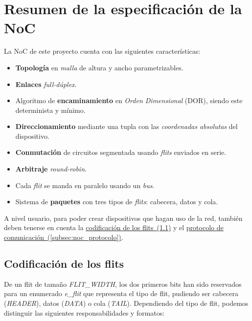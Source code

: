 \section{Resumen de la especificación de la NoC}
\label{sec:especificacion}

La NoC de este proyecto cuenta con las siguientes características:

\begin{itemize}[noitemsep]
    \item \textbf{Topología} en \textit{malla} de altura y ancho parametrizables.
    \item \textbf{Enlaces} \textit{full-dúplex}.
    \item Algoritmo de \textbf{encaminamiento} en \textit{Orden Dimensional} (DOR), siendo este determinista y mínimo.
    \item \textbf{Direccionamiento} mediante una tupla con las \textit{coordenadas absolutas} del dispositivo.
    \item \textbf{Conmutación} de circuitos segmentada usando \textit{flits} enviados en serie.
    \item \textbf{Arbitraje} \textit{round-robin}.
    \item Cada \textit{flit} se manda en paralelo usando un \textit{bus}.
    \item Sistema de \textbf{paquetes} con tres tipos de \textit{flits}: cabecera, datos y cola.
\end{itemize}

A nivel usuario, para poder crear dispositivos que hagan uso de la red, también deben tenerse en cuenta la \hyperref[subsec:codificacion_flits]{codificación de los flits~(\ref{subsec:codificacion_flits})} y el \hyperref[subsec:noc_protocolo]{protocolo de comunicación~(\ref{subsec:noc_protocolo})}.

\subsection{Codificación de los flits}
\label{subsec:codificacion_flits}

De un flit de tamaño \textit{FLIT\_WIDTH}, los dos primeros bits han sido reservados para un enumerado \textit{e\_flit} que representa el tipo de flit, pudiendo ser cabecera (\textit{HEADER}), datos (\textit{DATA}) o cola (\textit{TAIL}). Dependiendo del tipo de flit, podemos distinguir las siguientes responsabilidades y formatos:


